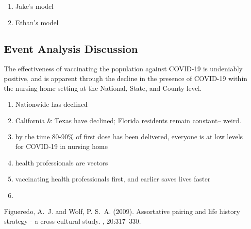 \documentclass[twoside]{article}
\begin{document}
\begin{multicols}{2}
\begin{enumerate}
	\item Jake's model
	\item Ethan's model
\end{enumerate}


\subsection{Event Analysis Discussion}

The effectiveness of vaccinating the population against COVID-19 is undeniably positive, and is apparent through the decline in the presence of COVID-19 within the nursing home setting at the National, State, and County level. 

\vspace{5mm}

\begin{enumerate}
	\item Nationwide has declined
	\item California \& Texas have declined; Florida residents remain constant-- weird.
	\item by the time 80-90\% of first dose has been delivered, everyone is at low levels for COVID-19 in nursing home
	\item health professionals are vectors
	\item vaccinating health professionals first, and earlier saves lives faster
	\item 
	
\end{enumerate} 


\begin{thebibliography}{99} %

Figueredo, A.~J. and Wolf, P. S.~A. (2009).
\newblock Assortative pairing and life history strategy - a cross-cultural
  study.
, 20:317--330.
 
\end{thebibliography}


\end{multicols}
\end{document}
